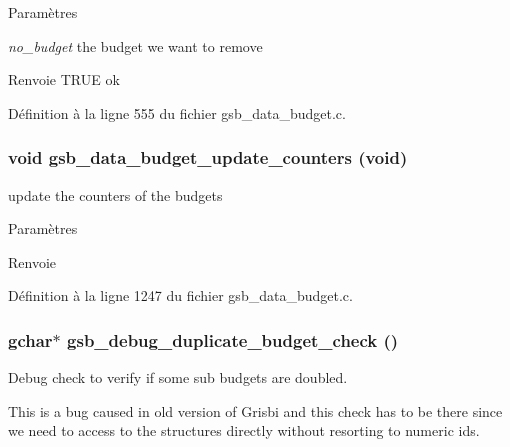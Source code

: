 \begin{DoxyParams}{Paramètres}
\item[{\em no\_\-budget}]the budget we want to remove\end{DoxyParams}
\begin{DoxyReturn}{Renvoie}
TRUE ok 
\end{DoxyReturn}


Définition à la ligne 555 du fichier gsb\_\-data\_\-budget.c.

\subsubsection[{gsb\_\-data\_\-budget\_\-update\_\-counters}]{\setlength{\rightskip}{0pt plus 5cm}void gsb\_\-data\_\-budget\_\-update\_\-counters (void)}\label{gsb__data__budget_8h_a0bbe7a3a70e1a8d1f6b57a311b4341ee}
update the counters of the budgets


\begin{DoxyParams}{Paramètres}
\item[{\em }]\end{DoxyParams}
\begin{DoxyReturn}{Renvoie}

\end{DoxyReturn}


Définition à la ligne 1247 du fichier gsb\_\-data\_\-budget.c.

\subsubsection[{gsb\_\-debug\_\-duplicate\_\-budget\_\-check}]{\setlength{\rightskip}{0pt plus 5cm}gchar$\ast$ gsb\_\-debug\_\-duplicate\_\-budget\_\-check ()}\label{gsb__data__budget_8h_acba891a0cbb4c3504b649cdbfe682816}


Debug check to verify if some sub budgets are doubled. 

This is a bug caused in old version of Grisbi and this check has to be there since we need to access to the structures directly without resorting to numeric ids.

